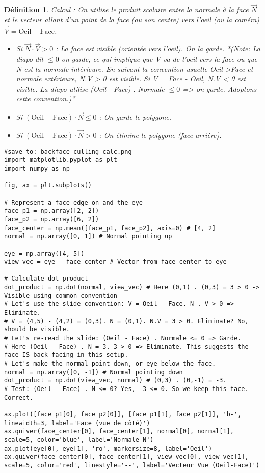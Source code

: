 \documentclass{article}
\newtheorem{definition}{Définition}
\begin{document}
{\begin{definition}
Calcul : On utilise le produit scalaire entre la normale à la face $\vec{N}$ et le vecteur allant d'un point de la face (ou son centre) vers l'oeil (ou la caméra) $\vec{V} = \text{Oeil} - \text{Face}$.
\begin{itemize}
    \item Si $\vec{N} \cdot \vec{V} > 0$ : La face est visible (orientée vers l'oeil). On la garde. *(Note: La diapo dit $\le 0$ on garde, ce qui implique que V va de l'oeil vers la face ou que N est la normale intérieure. En suivant la convention usuelle Oeil->Face et normale extérieure, N.V > 0 est visible. Si V = Face - Oeil, N.V < 0 est visible. La diapo utilise (Oeil - Face) . Normale $\le 0$ => on garde. Adoptons cette convention.)*
    \item Si $(\text{Oeil} - \text{Face}) \cdot \vec{N} \le 0$ : On garde le polygone.
    \item Si $(\text{Oeil} - \text{Face}) \cdot \vec{N} > 0$ : On élimine le polygone (face arrière).
\end{itemize}
\end{definition}

\begin{verbatim}
#save_to: backface_culling_calc.png
import matplotlib.pyplot as plt
import numpy as np

fig, ax = plt.subplots()

# Represent a face edge-on and the eye
face_p1 = np.array([2, 2])
face_p2 = np.array([6, 2])
face_center = np.mean([face_p1, face_p2], axis=0) # [4, 2]
normal = np.array([0, 1]) # Normal pointing up

eye = np.array([4, 5])
view_vec = eye - face_center # Vector from face center to eye

# Calculate dot product
dot_product = np.dot(normal, view_vec) # Here (0,1) . (0,3) = 3 > 0 -> Visible using common convention
# Let's use the slide convention: V = Oeil - Face. N . V > 0 => Eliminate.
# V = (4,5) - (4,2) = (0,3). N = (0,1). N.V = 3 > 0. Eliminate? No, should be visible.
# Let's re-read the slide: (Oeil - Face) . Normale <= 0 => Garde.
# Here (Oeil - Face) . N = 3. 3 > 0 => Eliminate. This suggests the face IS back-facing in this setup.
# Let's make the normal point down, or eye below the face.
normal = np.array([0, -1]) # Normal pointing down
dot_product = np.dot(view_vec, normal) # (0,3) . (0,-1) = -3.
# Test: (Oeil - Face) . N <= 0? Yes, -3 <= 0. So we keep this face. Correct.

ax.plot([face_p1[0], face_p2[0]], [face_p1[1], face_p2[1]], 'b-', linewidth=3, label='Face (vue de côté)')
ax.quiver(face_center[0], face_center[1], normal[0], normal[1], scale=5, color='blue', label='Normale N')
ax.plot(eye[0], eye[1], 'ro', markersize=8, label='Oeil')
ax.quiver(face_center[0], face_center[1], view_vec[0], view_vec[1], scale=5, color='red', linestyle='--', label='Vecteur Vue (Oeil-Face)')


\end{verbatim}}
\end{document}
